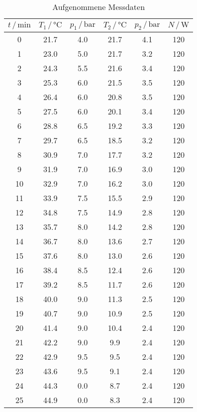 \begin{table}
\centering
\caption{Aufgenommene Messdaten}
\label{tab:Messdaten}
\begin{tabular}{c c c c c c}
\toprule
$t \,/\, \si{\minute}$ &
$T_1 \,/\, \si{\celsius}$ &
$p_1 \,/\, \si{\bar}$ &
$T_2 \,/\, \si{\celsius}$ &
$p_2 \,/\, \si{\bar}$ &
$N \,/\, \si{\watt}$ \\
\midrule
%
0	 & 21.7 & 4.0  & 21.7 & 4.1 & 120 \\
1  & 23.0 & 5.0  & 21.7 & 3.2	& 120 \\
2  & 24.3 & 5.5  & 21.6 & 3.4	& 120 \\
3  & 25.3 & 6.0  & 21.5 & 3.5	& 120 \\
4  & 26.4 & 6.0  & 20.8 & 3.5	& 120 \\
5  & 27.5 & 6.0  & 20.1 & 3.4	& 120 \\
6  & 28.8 & 6.5  & 19.2 & 3.3	& 120 \\
7  & 29.7 & 6.5  & 18.5 & 3.2	& 120 \\
8  & 30.9 & 7.0  & 17.7 & 3.2	& 120 \\
9  & 31.9 & 7.0  & 16.9 & 3.0	& 120 \\
10 & 32.9 & 7.0  & 16.2 & 3.0	& 120 \\
11 & 33.9 & 7.5  & 15.5 & 2.9	& 120 \\
12 & 34.8 & 7.5  & 14.9 & 2.8	& 120 \\
13 & 35.7 & 8.0  & 14.2 & 2.8	& 120 \\
14 & 36.7 & 8.0  & 13.6 & 2.7	& 120 \\
15 & 37.6 & 8.0  & 13.0 & 2.6	& 120 \\
16 & 38.4 & 8.5  & 12.4 & 2.6	& 120 \\
17 & 39.2 & 8.5  & 11.7 & 2.6	& 120 \\
18 & 40.0 & 9.0  & 11.3 & 2.5	& 120 \\
19 & 40.7 & 9.0  & 10.9 & 2.5	& 120 \\
20 & 41.4 & 9.0  & 10.4 & 2.4	& 120 \\
21 & 42.2 & 9.0  & 9.9  & 2.4	& 120 \\
22 & 42.9 & 9.5  & 9.5  & 2.4	& 120 \\
23 & 43.6 & 9.5  & 9.1  & 2.4	& 120 \\
24 & 44.3 & 0.0	 & 8.7  & 2.4	& 120 \\
25 & 44.9 & 0.0	 & 8.3  & 2.4	& 120 \\

\end{tabular}
\end{table}
